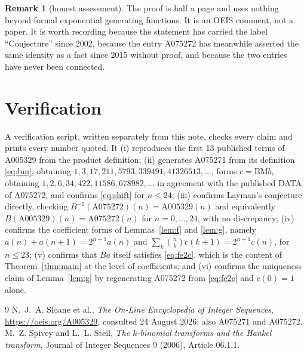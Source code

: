 \documentclass[11pt,a4paper]{article}
\theoremstyle{plain}
\theoremstyle{definition}
\newtheorem*{remark}{Remark}
\begin{document}
\begin{remark}[honest assessment]
The proof is half a page and uses nothing beyond formal exponential generating functions.
It is an OEIS comment, not a paper. It is worth recording because the statement has carried
the label ``Conjecture'' since 2002, because the entry A075272 has meanwhile asserted the
same identity as a fact since 2015 without proof, and because the two entries have never
been connected.
\end{remark}

\section{Verification}

A verification script, written separately from this note, checks every claim and prints
every number quoted. It (i) reproduces the first 13 published terms of A005329 from the
product definition; (ii) generates A075271 from its definition \eqref{eq:bm}, obtaining
$1,3,17,211,5793,339491,41326513,\dots$, forms $c=\mathrm{BM}b$, obtaining
$1,2,6,34,422,11586,678982,\dots$ in agreement with the published DATA of A075272, and
confirms \eqref{eq:shift} for $n\le24$; (iii) confirms Layman's conjecture directly,
checking $B^{-1}(\mathrm{A075272})(n)=\mathrm{A005329}(n)$ and equivalently
$B(\mathrm{A005329})(n)=\mathrm{A075272}(n)$ for $n=0,\dots,24$, with no discrepancy;
(iv) confirms the coefficient forms of Lemmas~\ref{lem:f} and \ref{lem:g}, namely
$a(n)+a(n+1)=2^{n+1}a(n)$ and $\sum_{k}\binom{n}{k}c(k+1)=2^{n+1}c(n)$, for $n\le23$;
(v) confirms that $Ba$ itself satisfies \eqref{eq:fe2c}, which is the content of
Theorem~\ref{thm:main} at the level of coefficients; and (vi) confirms the uniqueness claim
of Lemma~\ref{lem:g} by regenerating A075272 from \eqref{eq:fe2c} and $c(0)=1$ alone.

\begin{thebibliography}{9}
 N.~J.~A. Sloane et al., \emph{The On-Line Encyclopedia of Integer
Sequences}, \url{https://oeis.org/A005329}, consulted 24 August 2026; also A075271 and
A075272.
 M.~Z. Spivey and L.~L. Steil, \emph{The $k$-binomial transforms and the
Hankel transform}, Journal of Integer Sequences 9 (2006), Article 06.1.1.
\end{thebibliography}
\end{document}
